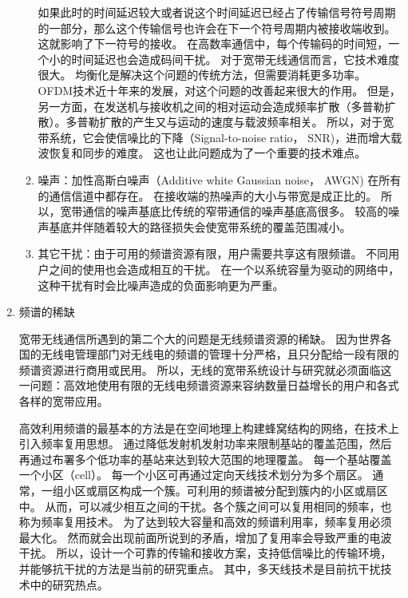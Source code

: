\begin{enumerate}[1)]
\begin{enumerate}[(1)]
如果此时的时间延迟较大或者说这个时间延迟已经占了传输信号符号周期的一部分，那么这个传输信号也许会在下一个符号周期内被接收端收到。
这就影响了下一符号的接收。
在高数率通信中，每个传输码的时间短，一个小的时间延迟也会造成码间干扰。
对于宽带无线通信而言，它技术难度很大。
均衡化是解决这个问题的传统方法，但需要消耗更多功率。
OFDM技术近十年来的发展，对这个问题的改善起来很大的作用。
但是，另一方面，在发送机与接收机之间的相对运动会造成频率扩散（多普勒扩散）。多普勒扩散的产生又与运动的速度与载波频率相关。
所以，对于宽带系统，它会使信噪比的下降（Signal-to-noise ratio， SNR)，进而增大载波恢复和同步的难度。
这也让此问题成为了一个重要的技术难点。
\item 噪声：加性高斯白噪声（Additive white Gaussian noise， AWGN) 在所有的通信信道中都存在。
在接收端的热噪声的大小与带宽是成正比的。
所以，宽带通信的噪声基底比传统的窄带通信的噪声基底高很多。
较高的噪声基底并伴随着较大的路径损失会使宽带系统的覆盖范围减小。
\item 其它干扰：由于可用的频谱资源有限，用户需要共享这有限频谱。
不同用户之间的使用也会造成相互的干扰。
在一个以系统容量为驱动的网络中，这种干扰有时会比噪声造成的负面影响更为严重。
\end{enumerate}
\item{频谱的稀缺}

宽带无线通信所遇到的第二个大的问题是无线频谱资源的稀缺。
因为世界各国的无线电管理部门对无线电的频谱的管理十分严格，且只分配给一段有限的频谱资源进行商用或民用。
所以，无线的宽带系统设计与研究就必须面临这一问题：高效地使用有限的无线电频谱资源来容纳数量日益增长的用户和各式各样的宽带应用。
\par 高效利用频谱的最基本的方法是在空间地理上构建蜂窝结构的网络，在技术上引入频率复用思想。
通过降低发射机发射功率来限制基站的覆盖范围，然后
再通过布署多个低功率的基站来达到较大范围的地理覆盖。
每一个基站覆盖一个小区（cell）。
每一个小区可再通过定向天线技术划分为多个扇区。
通常，一组小区或扇区构成一个簇。可利用的频谱被分配到簇内的小区或扇区中。
从而，可以减少相互之间的干扰。各个簇之间可以复用相同的频率，也称为频率复用技术。
为了达到较大容量和高效的频谱利用率，频率复用必须最大化。
然而就会出现前面所说到的矛盾，增加了复用率会导致严重的电波干扰。
所以，设计一个可靠的传输和接收方案，支持低信噪比的传输环境，并能够抗干扰的方法是当前的研究重点。
其中，多天线技术是目前抗干扰技术中的研究热点。


\end{enumerate}
